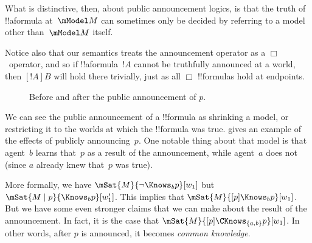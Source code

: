 \documentclass[../../../include/open-logic-section]{subfiles}
\begin{document}
What is distinctive, then, about public announcement logics, is that
the truth of !!a{formula} at~$\mModel M$ can sometimes only be decided
by referring to a model other than~$\mModel M$ itself.

Notice also that our semantics treats the announcement operator as a
$\Box$~operator, and so if !!a{formula}~$!A$ cannot be truthfully
announced at a world, then $[!A]B$ will hold there trivially, just as
all $\Box$ !!{formula}s hold at endpoints. 

\begin{figure}
  \begin{center}
  \end{center}
  \caption{Before and after the public announcement of $p$.}
\end{figure}

We can see the public announcement of a !!{formula} as shrinking a
model, or restricting it to the worlds at which the !!{formula} was
true.  gives an example of the effects
of publicly announcing~$p$. One notable thing about that model is that
agent~$b$ learns that~$p$ as a result of the announcement, while
agent~$a$ does not (since $a$ already knew that~$p$ was true).

More formally, we have $\mSat{M}{\lnot \Knows_b p}[w_1]$ but $\mSat{M
\mid p}{\Knows_b p}[w'_1]$. This implies that $\mSat{M}{[p] \Knows_b
p}[w_1]$. But we have some even stronger claims that we can make about
the result of the announcement. In fact, it is the case that
$\mSat{M}{[p]\CKnows_{\{a,b\}} p}[w_1]$. In other words, after $p$ is
announced, it becomes \emph{common knowledge}.
\end{document}
